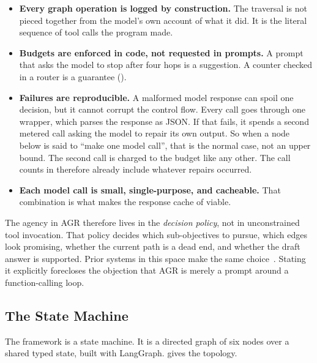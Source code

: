 \begin{itemize}
  \item \textbf{Every graph operation is logged by construction.} The traversal
  is not pieced together from the model's own account of what it did. It is the
  literal sequence of tool calls the program made.
  \item \textbf{Budgets are enforced in code, not requested in prompts.} A
  prompt that asks the model to stop after four hops is a suggestion. A counter
  checked in a router is a guarantee ().
  \item \textbf{Failures are reproducible.} A malformed model response can spoil
  one decision, but it cannot corrupt the control flow. Every call goes through
  one wrapper, which parses the response as JSON. If that fails, it spends a
  second metered call asking the model to repair its own output. So when a node
  below is said to ``make one model call'', that is the normal case, not an
  upper bound. The second call is charged to the budget like any other. The call
  counts in  therefore already include whatever repairs
  occurred.
  \item \textbf{Each model call is small, single-purpose, and cacheable.} That
  combination is what makes the response cache of 
  viable.
\end{itemize}

The agency in AGR therefore lives in the \emph{decision policy}, not in
unconstrained tool invocation. That policy decides which sub-objectives to
pursue, which edges look promising, whether the current path is a dead end, and
whether the draft answer is supported. Prior systems in this space make the same
choice~\cite{sun2024think,chen2024plan}. Stating it explicitly forecloses the
objection that AGR is merely a prompt around a function-calling loop.

\subsection{The State Machine}

The framework is a state machine. It is a directed graph of
six nodes over a shared typed state, built with LangGraph.
 gives the topology.


